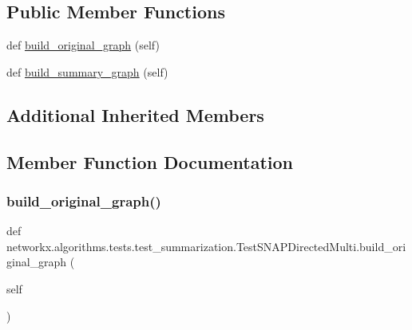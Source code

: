 \subsection*{Public Member Functions}
\begin{DoxyCompactItemize}
\item 
def \hyperlink{classnetworkx_1_1algorithms_1_1tests_1_1test__summarization_1_1TestSNAPDirectedMulti_aa26c31b1297d311394912e40945b363c}{build\+\_\+original\+\_\+graph} (self)
\item 
def \hyperlink{classnetworkx_1_1algorithms_1_1tests_1_1test__summarization_1_1TestSNAPDirectedMulti_af8c9ead2e9bcea3daa002402453361ea}{build\+\_\+summary\+\_\+graph} (self)
\end{DoxyCompactItemize}
\subsection*{Additional Inherited Members}


\subsection{Member Function Documentation}
\mbox{\label{classnetworkx_1_1algorithms_1_1tests_1_1test__summarization_1_1TestSNAPDirectedMulti_aa26c31b1297d311394912e40945b363c}} 
\subsubsection{\texorpdfstring{build\+\_\+original\+\_\+graph()}{build\_original\_graph()}}
{\footnotesize\ttfamily def networkx.\+algorithms.\+tests.\+test\+\_\+summarization.\+Test\+S\+N\+A\+P\+Directed\+Multi.\+build\+\_\+original\+\_\+graph (\begin{DoxyParamCaption}\item[{}]{self }\end{DoxyParamCaption})}

